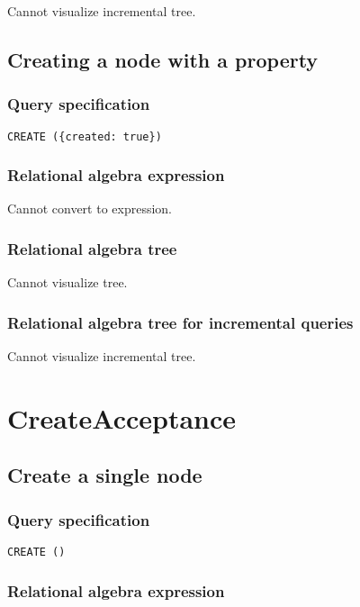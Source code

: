 Cannot visualize incremental tree.

\subsection{Creating a node with a property}

\subsubsection*{Query specification}

\begin{lstlisting}
CREATE ({created: true})
\end{lstlisting}

\subsubsection*{Relational algebra expression}

Cannot convert to expression.

\subsubsection*{Relational algebra tree}

Cannot visualize tree.

\subsubsection*{Relational algebra tree for incremental queries}

Cannot visualize incremental tree.

\section{CreateAcceptance}

\subsection{Create a single node}

\subsubsection*{Query specification}

\begin{lstlisting}
CREATE ()
\end{lstlisting}

\subsubsection*{Relational algebra expression}

